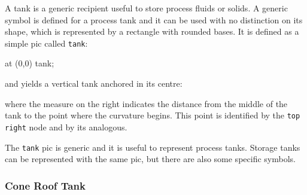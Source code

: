 \documentclass[12pt]{article}						%
\newcommand*{\chpn}[1]{\texttt{#1}}				%
\newcommand*{\chpp}[1]{\texttt{#1}}				%
\begin{document}
A tank is a generic recipient useful to store process fluids or solids. A generic
symbol is defined for a process tank and it can be used with no distinction on
its shape, which is represented by a rectangle with rounded bases. It is defined
as a simple pic called \chpp{tank}:
\begin{chpcode}
	\pic at (0,0) {tank};
\end{chpcode}
and yields a vertical tank anchored in its centre:
\begin{center}
\end{center}
where the measure on the right indicates the distance from the middle of the tank
to the point where the curvature begins. This point is identified by the
\chpn{top right} node and by its analogous.

The \chpp{tank} pic is generic and it is useful to represent process tanks.
Storage tanks can be represented with the same pic, but there are also some
specific symbols.

\subsubsection{Cone Roof Tank}
\end{document}
